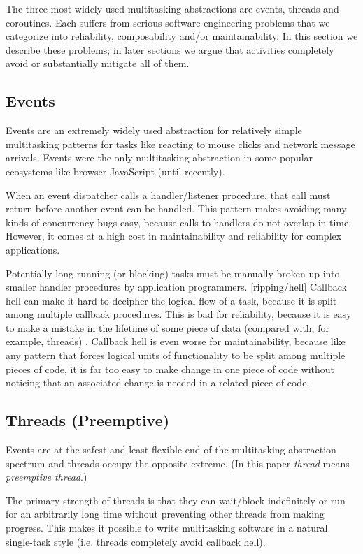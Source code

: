 \documentclass[10pt,preprint]{sigplanconf}
\begin{document}
The three most widely used multitasking abstractions are events, threads and coroutines.
Each suffers from serious software engineering problems that we categorize into reliability, composability and/or maintainability.
In this section we describe these problems; in later sections we argue that activities completely avoid or substantially mitigate all of them.

\subsection{Events}

Events are an extremely widely used abstraction for relatively simple multitasking patterns for tasks like reacting to mouse clicks and network message arrivals.
Events were the only multitasking abstraction in some popular ecosystems like browser JavaScript (until recently).

When an event dispatcher calls a handler/listener procedure, that call must return before another event can be handled.
This pattern makes avoiding many kinds of concurrency bugs easy, because calls to handlers do not overlap in time.
However, it comes at a high cost in maintainability and reliability for complex applications.

Potentially long-running (or blocking) tasks must be manually broken up into smaller handler procedures by application programmers.
[ripping/hell]
Callback hell can make it hard to decipher the logical flow of a task, because it is split among  multiple callback procedures.
This is bad for reliability, because it is easy to make a mistake in the lifetime of some piece of data (compared with, for example, threads) \cite{Behren2003a}.
Callback hell is even worse for maintainability, because like any pattern that forces logical units of functionality to be split among multiple pieces of code, it is far too easy to make change in one piece of code without noticing that an associated change is needed in a related piece of code.

\subsection{Threads (Preemptive)}

Events are at the safest and least flexible end of the multitasking abstraction spectrum and threads occupy the opposite extreme.
(In this paper \emph{thread} means \emph{preemptive thread}.)

The primary strength of threads is that they can wait/block indefinitely or run for an arbitrarily long time without preventing other threads from making progress.
This makes it possible to write multitasking software in a natural single-task style (i.e. threads completely avoid callback hell).
\end{document}
